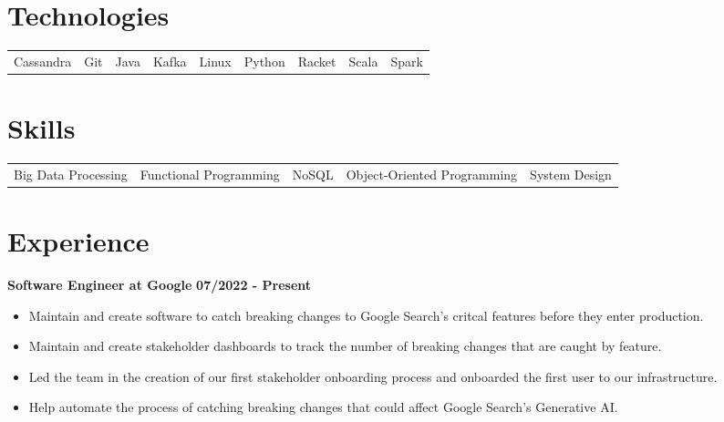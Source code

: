 \documentclass{res}
\begin{document}
\address{www.anthonyhicksiii.com}
\address{ahicks3rd@gmail.com}

\setlength\itemsep{0em}

\begin{resume}
\section{\large{Technologies}}
\begin{tabular}{	l	l	l 	l	l	l	l	l	l	}
	Cassandra  & Git  & Java & Kafka & Linux & Python & Racket & Scala & Spark
\end{tabular}

\section{\large{Skills}}
\begin{tabular}{	l 	l 	l 	l	l 	}
	Big Data Processing & Functional Programming & NoSQL & Object-Oriented Programming & System Design
\end{tabular}

\section{\large{Experience}}
	\textbf{Software Engineer at Google}
	\hfill{\bf 07/2022 - Present}
	\begin{itemize}
		\item Maintain and create software to catch breaking changes to Google Search's critcal features before they enter production.
		\item Maintain and create stakeholder dashboards to track the number of breaking changes that are caught by feature.
		\item Led the team in the creation of our first stakeholder onboarding process and onboarded the first user to our infrastructure.
		\item Help automate the process of catching breaking changes that could affect Google Search's Generative AI.
	\end{itemize}
	

\end{resume}
\end{document}
